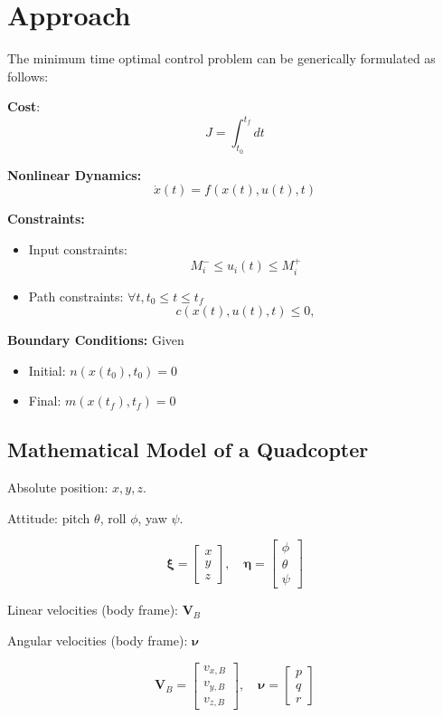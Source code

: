 
\section{Approach}
\label{sec:mathematical_formulation}

The minimum time optimal control problem can be generically formulated as follows:

\textbf{Cost}: $$J=\int_{t_{0}}^{t_{f}} d t$$

\textbf{Nonlinear Dynamics:} $$\dot{x}(t)= f(x(t), u(t), t)$$

\textbf{Constraints:} 
\begin{itemize}
  \item Input constraints:
    $$M_{i}^{-} \leq u_{i}(t) \leq M_{i}^{+}$$
  \item Path constraints:
  $\forall t, t_{0} \leq t \leq t_{f}$ 
  $$c(x(t), u(t), t) \leq 0,$$
\end{itemize}

\textbf{Boundary Conditions:}
Given 
\begin{itemize}
  \item Initial: $n(x(t_{0}), t_{0}) = 0$
  \item Final: $m(x(t_{f}), t_{f}) = 0$
\end{itemize}

\subsection{Mathematical Model of a Quadcopter}

Absolute position: $x, y, z$.

Attitude: pitch $\theta$, roll $\phi$, yaw $\psi$.

$$\boldsymbol{\xi}=\left[ \begin{array}{l}{x} \\ {y} \\ {z}\end{array}\right], \quad \boldsymbol{\eta}=\left[ \begin{array}{l}{\phi} \\ {\theta} \\ {\psi}\end{array}\right]$$

Linear velocities (body frame): $\boldsymbol{V}_{B}$

Angular velocities (body frame): $\boldsymbol{\nu}$

$$\boldsymbol{V}_{B}=\left[ \begin{array}{c}{v_{x, B}} \\ {v_{y, B}} \\ {v_{z, B}}\end{array}\right], \quad \boldsymbol{\nu}=\left[ \begin{array}{l}{p} \\ {q} \\ {r}\end{array}\right]$$

